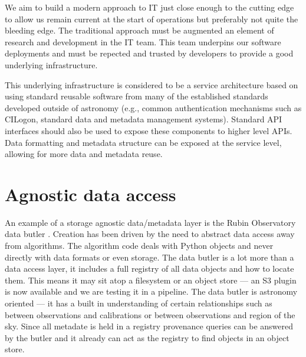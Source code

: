 We aim to build a modern approach to IT just close enough to the cutting edge to allow us remain current at the start of operations but preferably not quite the bleeding edge.
The traditional approach must be augmented an element of research and development in the IT team.
This team underpins our software deployments and must be repected and trusted by developers to provide a
good underlying infrastructure.

This underlying infrastructure is considered to be a service architecture based on using standard reusable software from many of the established standards developed outside of astronomy (e.g., common authentication mechanisms such as CILogon, standard data and metadata management systems). Standard API interfaces should also be used to expose these components to higher level APIs. Data formatting and metadata structure can be exposed at the service level, allowing for more data and metadata reuse.



\section{Agnostic data access}

An example of a storage agnostic data/metadata layer is the Rubin Observatory  data butler \citep{2018arXiv181208085J}.
Creation has been driven by the need to abstract data access away from algorithms.
The algorithm code deals with Python objects and never directly with data formats or even storage.
The data butler is a lot more than a data access layer, it includes a full registry of all data objects and how to locate them.
This means it may sit atop a filesystem or an object store — an S3 plugin is now available and we are testing it in a pipeline.
The data butler is astronomy oriented — it has a built in understanding of certain relationships such as between observations and calibrations or between observations and region of the sky.
Since all metadate is held in a registry provenance queries can be answered by the butler and it already can act as the registry to find objects in an object store.

